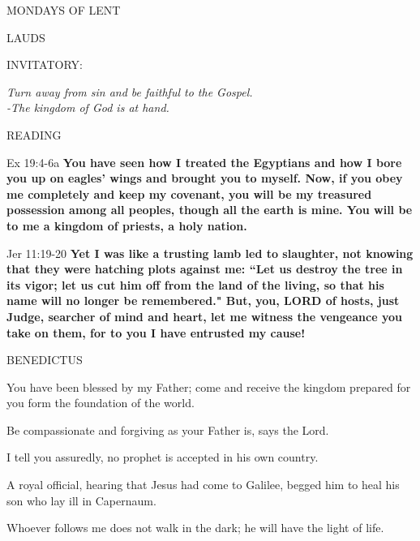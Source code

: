 \begin{center}
\normalsize MONDAYS OF LENT
\end{center}

\begin{flushleft}\normalsize{\uppercase{LAUDS\\}}\end{flushleft}
\small{\uppercase{INVITATORY:}}\normalsize
\begin{center}
\textit{Turn away from sin and be faithful to the Gospel.\\}
\textit{-The kingdom of God is at hand.\\}
\end{center}
\noindent\small READING
\begin{description}[labelindent=\parindent, leftmargin=*]
\item [Week 1-4:]   Ex 19:4-6a \textbf{  You have seen how I treated the Egyptians and how I bore you up on eagles’ wings and brought you to myself. Now, if you obey me completely and keep my covenant, you will be my treasured possession among all peoples, though all the earth is mine. You will be to me a kingdom of priests, a holy nation.\\}
\item [Week 5:]  Jer 11:19-20  \textbf{Yet I was like a trusting lamb led to slaughter, not knowing that they were hatching plots against me: “Let us destroy the tree in its vigor; let us cut him off from the land of the living, so that his name will no longer be remembered." But, you, LORD of hosts, just Judge, searcher of mind and heart, let me witness the vengeance you take on them, for to you I have entrusted my cause!}
\end{description}

\noindent\small BENEDICTUS
\begin{description}[labelindent=\parindent, leftmargin=*]
\item [Week 1:] 	You have been blessed by my Father; come and receive the kingdom prepared for you form the foundation of the world.
\item [Week 2:] 	Be compassionate and forgiving as your Father is, says the Lord.
\item [Week 3:] 	I tell you assuredly, no prophet is accepted in his own country.
\item [Week 4:] 	A royal official, hearing that Jesus had come to Galilee, begged him to heal his son who lay ill in Capernaum.
\item [Week 5:] 	Whoever follows me does not walk in the dark; he will have the light of life.
\end{description}

